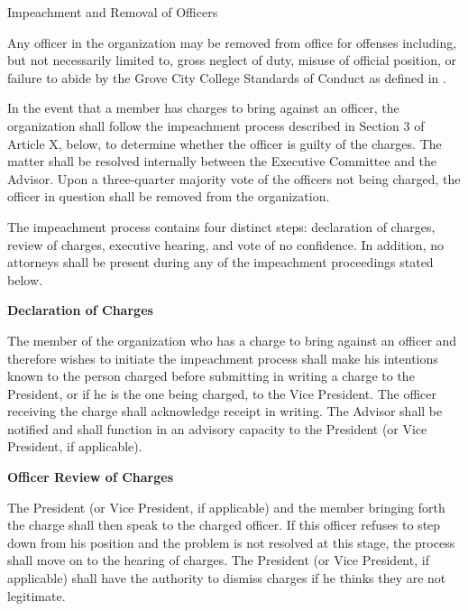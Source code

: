 {
	\begin{article}{Impeachment and Removal of Officers}
		\item Any officer in the organization may be removed from office for offenses including, but not necessarily limited to, gross neglect of duty, misuse of official position, or failure to abide by the Grove City College Standards of Conduct as defined in \crimson.
		\item In the event that a member has charges to bring against an officer, the organization shall follow the impeachment process described in Section 3 of Article X, below, to determine whether the officer is guilty of the charges. The matter shall be resolved internally between the Executive Committee and the Advisor. Upon a three-quarter majority vote of the officers not being charged, the officer in question shall be removed from the organization.
		\item The impeachment process contains four distinct steps: declaration of charges, review of charges, executive hearing, and vote of no confidence.  In addition, no attorneys shall be present during any of the impeachment proceedings stated below.
			
		\hypertarget{Declaration of Charges}{}
		\textbf{Declaration of Charges}
		
		\begin{adjustwidth*}{2em}{}
			The member of the organization who has a charge to bring against an officer and therefore wishes to initiate the impeachment process shall make his intentions known to the person charged before submitting in writing a charge to the President, or if he is the one being charged, to the Vice President. The officer receiving the charge shall acknowledge receipt in writing. The Advisor shall be notified and shall function in an advisory capacity to the President (or Vice President, if applicable).
		\end{adjustwidth*}
	
		\hypertarget{Officer Review of Charges}{}
		\textbf{Officer Review of Charges}
		
		\begin{adjustwidth*}{2em}{}
			The President (or Vice President, if applicable) and the member bringing forth the charge shall then speak to the charged officer. If this officer refuses to step down from his position and the problem is not resolved at this stage, the process shall move on to the hearing of charges. The President (or Vice President, if applicable) shall have the authority to dismiss charges if he thinks they are not legitimate.
		\end{adjustwidth*}
	

\end{article}}
